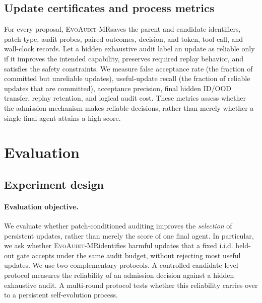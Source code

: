 \documentclass{article}
\newcommand{\method}{\textsc{EvoAudit-MR}}
\begin{document}
\subsection{Update certificates and process metrics}

For every proposal, \method saves the parent and candidate identifiers, patch type, audit probes, paired outcomes, decision, and token, tool-call, and wall-clock records. Let a hidden exhaustive audit label an update as reliable only if it improves the intended capability, preserves required replay behavior, and satisfies the safety constraints. We measure false acceptance rate (the fraction of committed but unreliable updates), useful-update recall (the fraction of reliable updates that are committed), acceptance precision, final hidden ID/OOD transfer, replay retention, and logical audit cost. These metrics assess whether the admission mechanism makes reliable decisions, rather than merely whether a single final agent attains a high score.

\section{Evaluation}

\subsection{Experiment design}

\paragraph{Evaluation objective.}
We evaluate whether patch-conditioned auditing improves the \emph{selection} of persistent updates, rather than merely the score of one final agent. In particular, we ask whether \method identifies harmful updates that a fixed i.i.d. held-out gate accepts under the same audit budget, without rejecting most useful updates. We use two complementary protocols. A controlled candidate-level protocol measures the reliability of an admission decision against a hidden exhaustive audit. A multi-round protocol tests whether this reliability carries over to a persistent self-evolution process.
\end{document}

